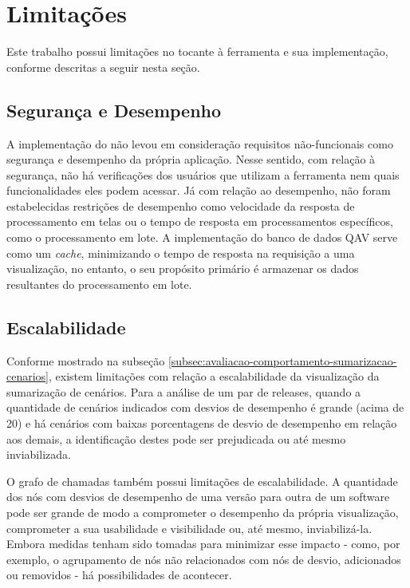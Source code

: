 \section{Limitações} \label{sec:consideracoes-limitacoes}

Este trabalho possui limitações no tocante à ferramenta e sua implementação, conforme descritas a seguir nesta seção.

\subsection{Segurança e Desempenho} \label{subsec:consideracoes-limitacoes-seguranca-desempenho}

A implementação do \textit{\toolName} não levou em consideração requisitos não-funcionais como segurança e desempenho da própria aplicação. Nesse sentido, com relação à segurança, não há verificações dos usuários que utilizam a ferramenta nem quais funcionalidades eles podem acessar. Já com relação ao desempenho, não foram estabelecidas restrições de desempenho como velocidade da resposta de processamento em telas ou o tempo de resposta em processamentos específicos, como o processamento em lote. A implementação do banco de dados QAV serve como um \textit{cache}, minimizando o tempo de resposta na requisição a uma visualização, no entanto, o seu propósito primário é armazenar os dados resultantes do processamento em lote.

\subsection{Escalabilidade} \label{subsec:consideracoes-limitacoes-escalabilidade}

Conforme mostrado na subseção \ref{subsec:avaliacao-comportamento-sumarizacao-cenarios}, existem limitações com relação a escalabilidade da visualização da sumarização de cenários. Para a análise de um par de releases, quando a quantidade de cenários indicados com desvios de desempenho é grande (acima de 20) e há cenários com baixas porcentagens de desvio de desempenho em relação aos demais, a identificação destes pode ser prejudicada ou até mesmo inviabilizada.

O grafo de chamadas também possui limitações de escalabilidade. A quantidade dos nós com desvios de desempenho de uma versão para outra de um software pode ser grande de modo a comprometer o desempenho da própria visualização, comprometer a sua usabilidade e visibilidade ou, até mesmo, inviabilizá-la. Embora medidas tenham sido tomadas para minimizar esse impacto - como, por exemplo, o agrupamento de nós não relacionados com nós de desvio, adicionados ou removidos - há possibilidades de acontecer.

